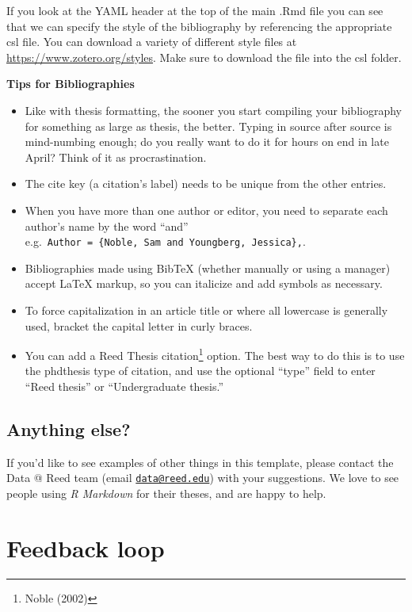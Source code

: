 If you look at the YAML header at the top of the main .Rmd file you can see that we can specify the style of the bibliography by referencing the appropriate csl file. You can download a variety of different style files at \url{https://www.zotero.org/styles}. Make sure to download the file into the csl folder.

\vfill

\textbf{Tips for Bibliographies}
\begin{itemize}
\tightlist
\item
  Like with thesis formatting, the sooner you start compiling your bibliography for something as large as thesis, the better. Typing in source after source is mind-numbing enough; do you really want to do it for hours on end in late April? Think of it as procrastination.
\item
  The cite key (a citation's label) needs to be unique from the other entries.
\item
  When you have more than one author or editor, you need to separate each author's name by the word ``and'' e.g.~\texttt{Author\ =\ \{Noble,\ Sam\ and\ Youngberg,\ Jessica\},}.
\item
  Bibliographies made using BibTeX (whether manually or using a manager) accept LaTeX markup, so you can italicize and add symbols as necessary.
\item
  To force capitalization in an article title or where all lowercase is generally used, bracket the capital letter in curly braces.
\item
  You can add a Reed Thesis citation\footnote{Noble (2002)} option. The best way to do this is to use the phdthesis type of citation, and use the optional ``type'' field to enter ``Reed thesis'' or ``Undergraduate thesis.''
\end{itemize}
\hypertarget{anything-else}{%
\section{Anything else?}\label{anything-else}}

If you'd like to see examples of other things in this template, please contact the Data @ Reed team (email \href{mailto:data@reed.edu}{\nolinkurl{data@reed.edu}}) with your suggestions. We love to see people using \emph{R Markdown} for their theses, and are happy to help.

\hypertarget{feedback}{%
\chapter{Feedback loop}\label{feedback}}

